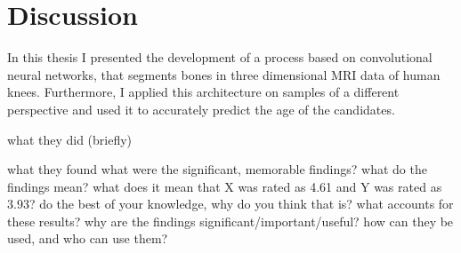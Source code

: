 \section{Discussion}

In this thesis I presented the development of a process based on convolutional neural networks, that segments bones in three dimensional MRI data of human knees. Furthermore, I applied this architecture on samples of a different perspective and used it to accurately predict the age of the candidates.


what they did (briefly)

what they found
what were the significant, memorable findings?
what do the findings mean?
what does it mean that X was rated as 4.61 and Y was rated as 3.93?
do the best of your knowledge, why do you think that is? what accounts for these results?
why are the findings significant/important/useful? how can they be used, and who can use them?

\newpage